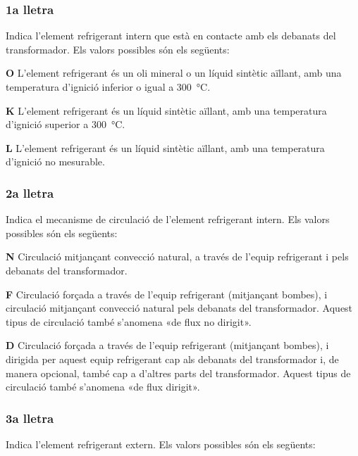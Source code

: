 \subsubsection*{1a lletra}
Indica l'element refrigerant intern que està en
contacte amb els debanats del transformador. Els valors possibles
són els següents:

\begin{list}{}
   {\setlength{\labelwidth}{10mm} \setlength{\leftmargin}{10mm} \setlength{\labelsep}{2mm}}
   \item[\textbf{O}] L'element refrigerant és un oli mineral o un líquid sintètic aïllant, amb una temperatura d'ignició
   inferior o igual a \SI{300}{\degreeCelsius}.
   \item[\textbf{K}] L'element refrigerant és un líquid sintètic aïllant, amb una temperatura d'ignició
   superior a \SI{300}{\degreeCelsius}.
   \item[\textbf{L}] L'element refrigerant és un líquid sintètic aïllant, amb una temperatura d'ignició
   no mesurable.
\end{list}
  

\subsubsection*{2a lletra}
Indica el mecanisme de circulació de l'element
refrigerant intern. Els valors possibles són els següents:

\begin{list}{}
   {\setlength{\labelwidth}{10mm} \setlength{\leftmargin}{10mm} \setlength{\labelsep}{2mm}}
   \item[\textbf{N}] Circulació mitjançant convecció natural,
    a través de l'equip refrigerant i pels debanats del transformador.
   \item[\textbf{F}] Circulació forçada a través de l'equip refrigerant (mitjançant bombes),
    i circulació mitjançant convecció natural pels debanats del
    transformador. Aquest tipus de circulació també s'anomena «de flux no
    dirigit».
   \item[\textbf{D}] Circulació forçada a través de l'equip refrigerant (mitjançant bombes),
    i dirigida per aquest equip refrigerant cap als debanats del
    transformador i, de manera opcional, també cap a d'altres parts del transformador. Aquest
    tipus de circulació també s'anomena «de flux dirigit».
\end{list}
  

\subsubsection*{3a lletra}
 Indica l'element refrigerant extern. Els valors
possibles són els següents:

